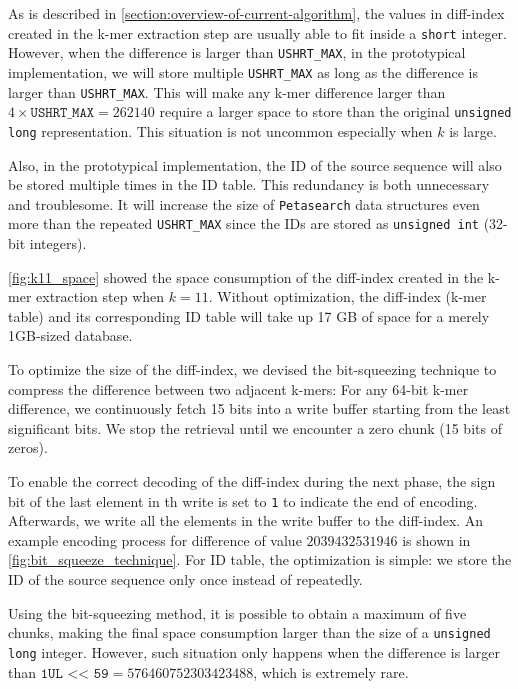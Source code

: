 As is described in \cref{section:overview-of-current-algorithm}, the values in diff-index created in the k-mer extraction step are usually able to fit inside a \texttt{short} integer.
However, when the difference is larger than \texttt{USHRT\_MAX}, in the prototypical implementation, we will store multiple \texttt{USHRT\_MAX} as long as the difference is larger than \texttt{USHRT\_MAX}.
This will make any k-mer difference larger than $4 \times \mathtt{USHRT\_MAX} = 262140$ require a larger space to store than the original \texttt{unsigned long} representation.
This situation is not uncommon especially when $k$ is large.

Also, in the prototypical implementation, the ID of the source sequence will also be stored multiple times in the ID table.
This redundancy is both unnecessary and troublesome.
It will increase the size of \texttt{Petasearch} data structures even more than the repeated \texttt{USHRT\_MAX} since the IDs are stored as \texttt{unsigned int} (32-bit integers).

\autoref{fig:k11_space} showed the space consumption of the diff-index created in the k-mer extraction step when $k = 11$.
Without optimization, the diff-index (k-mer table) and its corresponding ID table will take up 17 GB of space for a merely 1GB-sized database.

To optimize the size of the diff-index, we devised the bit-squeezing technique to compress the difference between two adjacent k-mers:
For any 64-bit k-mer difference, we continuously fetch 15 bits into a write buffer starting from the least significant bits.
We stop the retrieval until we encounter a zero chunk (15 bits of zeros).

To enable the correct decoding of the diff-index during the next phase, the sign bit of the last element in th write is set to \texttt{1} to indicate the end of encoding.
Afterwards, we write all the elements in the write buffer to the diff-index.
An example encoding process for difference of value $2039432531946$ is shown in \autoref{fig:bit_squeeze_technique}.
For ID table, the optimization is simple: we store the ID of the source sequence only once instead of repeatedly.

Using the bit-squeezing method, it is possible to obtain a maximum of five chunks, making the final space consumption larger than the size of a \texttt{unsigned long} integer.
However, such situation only happens when the difference is larger than $\texttt{1UL << 59} = 576460752303423488$, which is extremely rare.

